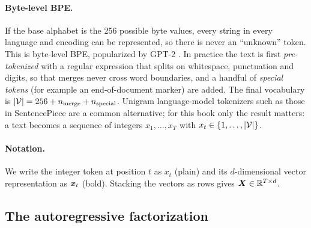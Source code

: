 \paragraph{Byte-level BPE.} If the base alphabet is the 256 possible byte values, every
string in every language and encoding can be represented, so there is never an
``unknown'' token. This is byte-level BPE, popularized by GPT-2 \citep{c01-radford2019gpt2}.
In practice the text is first \emph{pre-tokenized} with a regular expression that splits
on whitespace, punctuation and digits, so that merges never cross word boundaries, and a
handful of \emph{special tokens} (for example an end-of-document marker) are added. The
final vocabulary is
$\left\lvert \mathcal{V}\right\rvert = 256 + n_{\mathrm{merge}} + n_{\mathrm{special}}$. Unigram language-model
tokenizers such as those in SentencePiece \citep{c01-kudo2018sentencepiece} are a
common alternative; for this book only the result matters: a text becomes a sequence of
integers $x_1, \dots, x_T$ with $x_t \in \{1, \dots, \left\lvert \mathcal{V}\right\rvert\}$.

\paragraph{Notation.} We write the integer token at position $t$ as $x_t$ (plain) and its
$d$-dimensional vector representation as $\bm{x}_t$ (bold). Stacking the vectors as rows gives
$\bm{X} \in \mathbb{R}^{T \times d}$.

\subsection{The autoregressive factorization}\label{sec:c01-factorization}

